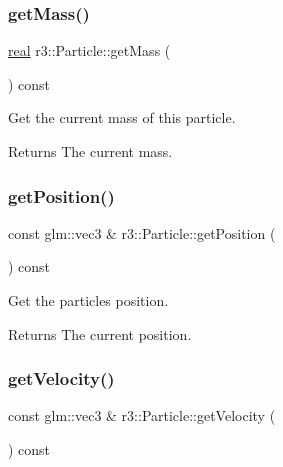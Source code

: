 \subsubsection{\texorpdfstring{get\+Mass()}{getMass()}}
{\footnotesize\ttfamily \mbox{\hyperlink{namespacer3_ab2016b3e3f743fb735afce242f0dc1eb}{real}} r3\+::\+Particle\+::get\+Mass (\begin{DoxyParamCaption}{ }\end{DoxyParamCaption}) const}



Get the current mass of this particle. 

\begin{DoxyReturn}{Returns}
The current mass. 
\end{DoxyReturn}
\mbox{\label{classr3_1_1_particle_a6f61c64625f2d9bf7fe1145d74790a92}} 
\subsubsection{\texorpdfstring{get\+Position()}{getPosition()}}
{\footnotesize\ttfamily const glm\+::vec3 \& r3\+::\+Particle\+::get\+Position (\begin{DoxyParamCaption}{ }\end{DoxyParamCaption}) const}



Get the particle\textquotesingle{}s position. 

\begin{DoxyReturn}{Returns}
The current position. 
\end{DoxyReturn}
\mbox{\label{classr3_1_1_particle_ad62513767465d21c328b4296aa9720ff}} 
\subsubsection{\texorpdfstring{get\+Velocity()}{getVelocity()}}
{\footnotesize\ttfamily const glm\+::vec3 \& r3\+::\+Particle\+::get\+Velocity (\begin{DoxyParamCaption}{ }\end{DoxyParamCaption}) const}



